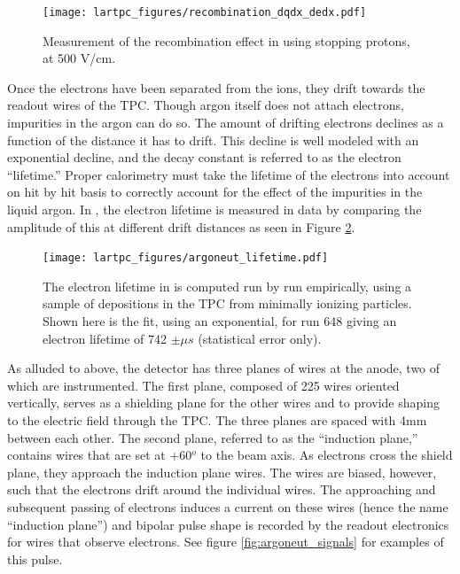 \begin{figure}[h]
  \centering
  \texttt{[image: lartpc\_figures/recombination\_dqdx\_dedx.pdf]}
  \caption{Measurement of the recombination effect in \argoneut using stopping protons, at 500 V/cm.}
  \label{fig:argoneut_recombination}
\end{figure}

Once the electrons have been separated from the ions, they drift towards the readout wires of the TPC.  Though argon itself does not attach electrons, impurities in the argon can do so.  The amount of drifting electrons declines as a function of the distance it has to drift.  This decline is well modeled with an exponential decline, and the decay constant is referred to as the electron ``lifetime.'' Proper calorimetry must take the lifetime of the electrons into account on hit by hit basis to correctly account for the effect of the impurities in the liquid argon.  In \argoneut, the electron lifetime is measured in data by comparing the amplitude of this at different drift distances as seen in Figure \ref{fig:argoneut_lifetime}.

\begin{figure}[h]
  \centering
  \texttt{[image: lartpc\_figures/argoneut\_lifetime.pdf]}
  \caption{The electron lifetime in \argoneut is computed run by run empirically, using a sample of depositions in the TPC from minimally ionizing particles.  Shown here is the fit, using an exponential, for run 648 giving an electron lifetime of 742 $\pm \mu s$ (statistical error only).}
  \label{fig:argoneut_lifetime}
\end{figure}


As alluded to above, the \argoneut detector has three planes of wires at the anode, two of which are instrumented.  The first plane, composed of 225 wires oriented vertically, serves as a shielding plane for the other wires and to provide shaping to the electric field through the TPC.  The three planes are spaced with 4mm between each other.  The second plane, referred to as the ``induction plane,'' contains wires that are set at +60$^o$ to the beam axis.  As electrons cross the shield plane, they approach the induction plane wires.  The wires are biased, however, such that the electrons drift around the individual wires.  The approaching and subsequent passing of electrons induces a current on these wires (hence the name ``induction plane'') and bipolar pulse shape is recorded by the readout electronics for wires that observe electrons.  See figure \ref{fig:argoneut_signals} for examples of this pulse.

